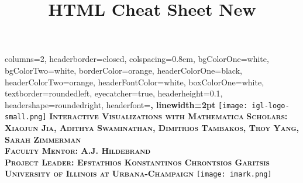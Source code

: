 \documentclass[landscape,paperheight=24in,paperwidth=36in,fontscale=0.40]{baposter} %
\title{HTML Cheat Sheet New}
\begin{document}
\begin{poster}
{
columns=2,
headerborder=closed, %
colspacing=0.8em, %
bgColorOne=white, %
bgColorTwo=white, %
borderColor=orange, %
headerColorOne=black, %
headerColorTwo=orange, %
headerFontColor=white, %
boxColorOne=white, %
textborder=roundedleft, %
eyecatcher=true, %
headerheight=0.1\textheight, %
headershape=roundedright, %
headerfont=\Large\bf\textsc, %
linewidth=2pt %
}
{\texttt{[image: igl-logo-small.png]}}
{\vspace{-1.2em} 
\bf\textsc{Interactive Visualizations with Mathematica
}}%
{\vspace{2.1em}
\large\bf\textsc{Scholars: Xiaojun Jia, Adithya Swaminathan,
	Dimitrios Tambakos, Troy Yang, Sarah Zimmerman
\\  Faculty Mentor: A.J. Hildebrand
\\  Project Leader: Efstathios Konstantinos Chrontsios Garitsis
\\ \vspace{0.05em} \normalsize{University of Illinois at Urbana-Champaign}}}
{\texttt{[image: imark.png]}}

\end{poster}
\end{document}
